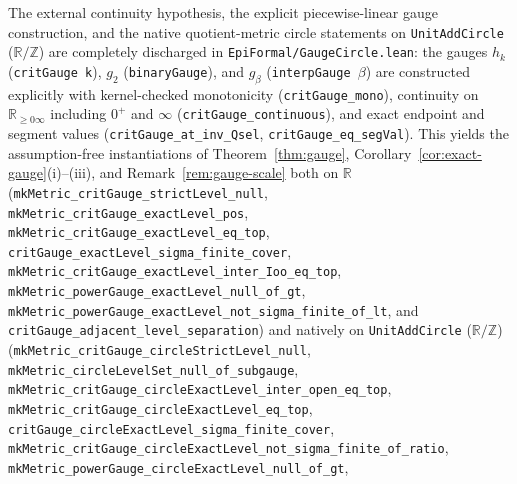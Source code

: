 \documentclass[11pt]{article}
\theoremstyle{definition}
\theoremstyle{remark}
\newcommand{\R}{\mathbb{R}}
\newcommand{\Z}{\mathbb{Z}}
\begin{document}
The external continuity hypothesis, the explicit piecewise-linear gauge
construction, and the native quotient-metric circle statements on
\texttt{UnitAddCircle} ($\R/\Z$) are completely discharged in
\texttt{EpiFormal/\allowbreak GaugeCircle.lean}:
the gauges $h_k$ (\texttt{critGauge k}), $g_2$ (\texttt{binaryGauge}), and
$g_\beta$ (\texttt{interpGauge \ensuremath{\beta}}) are constructed explicitly
with kernel-checked monotonicity (\texttt{critGauge\_\allowbreak mono}),
continuity on $\R_{\ge0\infty}$ including $0^+$ and $\infty$
(\texttt{critGauge\_\allowbreak continuous}), and exact endpoint and segment
values (\texttt{critGauge\_\allowbreak at\_\allowbreak inv\_\allowbreak Qsel},
\texttt{critGauge\_\allowbreak eq\_\allowbreak segVal}).
This yields the assumption-free instantiations of Theorem~\ref{thm:gauge},
Corollary~\ref{cor:exact-gauge}(i)--(iii), and Remark~\ref{rem:gauge-scale} both
on $\R$
(\texttt{mkMetric\_\allowbreak critGauge\_\allowbreak strictLevel\_\allowbreak null},
\texttt{mkMetric\_\allowbreak critGauge\_\allowbreak exactLevel\_\allowbreak pos},
\texttt{mkMetric\_\allowbreak critGauge\_\allowbreak exactLevel\_\allowbreak eq\_\allowbreak top},
\texttt{critGauge\_\allowbreak exactLevel\_\allowbreak sigma\_\allowbreak finite\_\allowbreak cover},
\texttt{mkMetric\_\allowbreak critGauge\_\allowbreak exactLevel\_\allowbreak inter\_\allowbreak Ioo\_\allowbreak eq\_\allowbreak top},
\texttt{mkMetric\_\allowbreak powerGauge\_\allowbreak exactLevel\_\allowbreak null\_\allowbreak of\_\allowbreak gt},
\texttt{mkMetric\_\allowbreak powerGauge\_\allowbreak exactLevel\_\allowbreak not\_\allowbreak sigma\_\allowbreak finite\_\allowbreak of\_\allowbreak lt},
and \texttt{critGauge\_\allowbreak adjacent\_\allowbreak level\_\allowbreak separation})
and natively on \texttt{UnitAddCircle} ($\R/\Z$)
(\texttt{mkMetric\_\allowbreak critGauge\_\allowbreak circleStrictLevel\_\allowbreak null},
\texttt{mkMetric\_\allowbreak circleLevelSet\_\allowbreak null\_\allowbreak of\_\allowbreak subgauge},
\texttt{mkMetric\_\allowbreak critGauge\_\allowbreak circleExactLevel\_\allowbreak inter\_\allowbreak open\_\allowbreak eq\_\allowbreak top},
\texttt{mkMetric\_\allowbreak critGauge\_\allowbreak circleExactLevel\_\allowbreak eq\_\allowbreak top},
\texttt{critGauge\_\allowbreak circleExactLevel\_\allowbreak sigma\_\allowbreak finite\_\allowbreak cover},
\texttt{mkMetric\_\allowbreak critGauge\_\allowbreak circleExactLevel\_\allowbreak not\_\allowbreak sigma\_\allowbreak finite\_\allowbreak of\_\allowbreak ratio},
\texttt{mkMetric\_\allowbreak powerGauge\_\allowbreak circleExactLevel\_\allowbreak null\_\allowbreak of\_\allowbreak gt},
\end{document}
